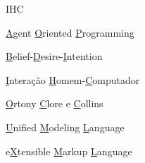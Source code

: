 \begin{listofabbrv}{IHC}
		\item[AOP] \underline{A}gent \underline{O}riented \underline{P}rogramming
		\item[BDI] \underline{B}elief-\underline{D}esire-\underline{I}ntention
        \item[IHC] \underline{I}ntera\c{c}\~{a}o \underline{H}omem-\underline{C}omputador
        \item[OCC] \underline{O}rtony \underline{C}lore e \underline{C}ollins
        \item[UML] \underline{U}nified \underline{M}odeling \underline{L}anguage
        \item[XML] e\underline{X}tensible \underline{M}arkup \underline{L}anguage
\end{listofabbrv}

